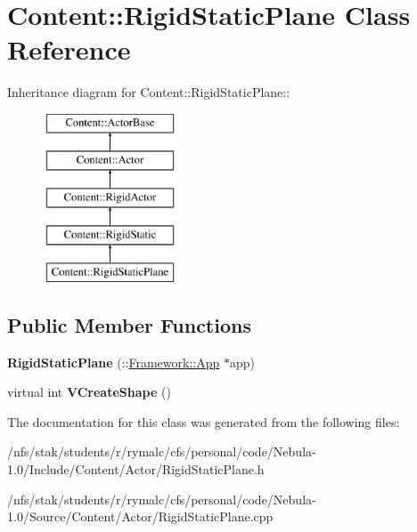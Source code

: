 \hypertarget{classContent_1_1RigidStaticPlane}{
\section{Content::RigidStaticPlane Class Reference}
\label{classContent_1_1RigidStaticPlane}
}
Inheritance diagram for Content::RigidStaticPlane::\begin{figure}[H]
\begin{center}
\leavevmode
\includegraphics[height=5cm]{classContent_1_1RigidStaticPlane}
\end{center}
\end{figure}
\subsection*{Public Member Functions}
\begin{DoxyCompactItemize}
\item 
\hypertarget{classContent_1_1RigidStaticPlane_ac34e1918f2804dcce10de56f34ad3999}{
{\bfseries RigidStaticPlane} (::\hyperlink{classFramework_1_1App}{Framework::App} $\ast$app)}
\label{classContent_1_1RigidStaticPlane_ac34e1918f2804dcce10de56f34ad3999}

\item 
\hypertarget{classContent_1_1RigidStaticPlane_a388d82aceb5348fcb6b69c16fb626571}{
virtual int {\bfseries VCreateShape} ()}
\label{classContent_1_1RigidStaticPlane_a388d82aceb5348fcb6b69c16fb626571}

\end{DoxyCompactItemize}


The documentation for this class was generated from the following files:\begin{DoxyCompactItemize}
\item 
/nfs/stak/students/r/rymalc/cfs/personal/code/Nebula-\/1.0/Include/Content/Actor/RigidStaticPlane.h\item 
/nfs/stak/students/r/rymalc/cfs/personal/code/Nebula-\/1.0/Source/Content/Actor/RigidStaticPlane.cpp\end{DoxyCompactItemize}

